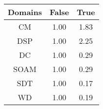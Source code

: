 \begin{tabular}{|c||c|c|}
\hline
Domains & False & True \\ 
\hline
CM & \cellcolor[rgb]{0.9098413113321151,0.8392488736386781,0.41985189057664074} 1.00 & \cellcolor[rgb]{0.6577302792162497,0.720503816470855,0.42} 1.83 \\ 
\hline
DSP & \cellcolor[rgb]{0.9097609634100798,0.8388685601410444,0.41977689918274114} 1.00 & \cellcolor[rgb]{0.53,0.66,0.42} 2.25 \\ 
\hline
DC & \cellcolor[rgb]{0.90976919799168,0.8398906727329009,0.42} 1.00 & \cellcolor[rgb]{0.7813028572051028,0.2308335241041533,0.29988266672476266} 0.29 \\ 
\hline
SOAM & \cellcolor[rgb]{0.909771535556903,0.8398917800006382,0.42} 1.00 & \cellcolor[rgb]{0.7826063032518457,0.2370031687254028,0.3010992163683893} 0.29 \\ 
\hline
SDT & \cellcolor[rgb]{0.9097309940182341,0.8398725761139002,0.42} 1.00 & \cellcolor[rgb]{0.76,0.13,0.28} 0.17 \\ 
\hline
WD & \cellcolor[rgb]{0.9097364364438114,0.8398751541049633,0.42} 1.00 & \cellcolor[rgb]{0.7630347423178452,0.1443644469711339,0.2828324261633222} 0.19 \\ 
\hline
\end{tabular}